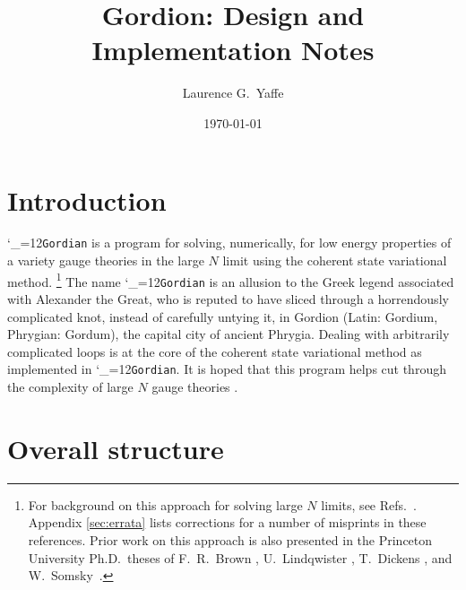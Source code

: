 \documentclass [12pt]{article}
\title	{Gordion: Design and Implementation Notes}
\date	{\today\vspace*{-20pt}}
\author	{Laurence G.~Yaffe}
\affil{%
    \small
    Department of Physics, University of Washington, Seattle WA 98195, USA
    \vspace*{-10pt}
    }%
\makeatletter
\renewcommand{\tt}{\begingroup\catcode`_=12\def\_{\string_}\tt@}
\newcommand{\tt@}[1]{\texttt{#1}\endgroup}
\makeatother
\begin{document}
\maketitle
\tableofcontents
\newpage
\setlength{\parskip}{5pt plus 2pt minus 1pt}

\section {Introduction}

\tt{Gordian} is a program for solving, numerically,
for low energy properties of
a variety gauge theories in the large $N$ limit using the
coherent state variational method.%
\footnote
    {%
    For background on this approach for solving large $N$ limits,
    see Refs.~\cite{YaffeRMP, CSVAI, CSVAII,Yaffe:2026ouz}.
    Appendix \ref{sec:errata} lists corrections for
    a number of misprints in these references.
    Prior work on this approach is also presented
    in the Princeton University Ph.D.~theses
    of F.~R.~Brown \cite{Brown:1987km},
    U.~Lindqwister \cite {Lindqwister:1988xc},
    T.~Dickens \cite{Dickens:1987ih},
    and W.~Somsky~\cite{Somsky:1989}.
    }
The name \tt{Gordian} is an allusion to the Greek legend
associated with Alexander the Great, who
is reputed to have sliced through a horrendously complicated
knot, instead of carefully untying it,
in Gordion (Latin: Gordium, Phrygian: Gordum),
the capital city of ancient Phrygia.
Dealing with arbitrarily complicated loops is at the
core of the coherent state variational method as
implemented in \tt{Gordian}.
It is hoped that this program helps cut through
the complexity of large $N$ gauge theories
{\large\smiley{}}.

\setlength{\parskip}{3pt}

\section {Overall structure}
\end{document}
